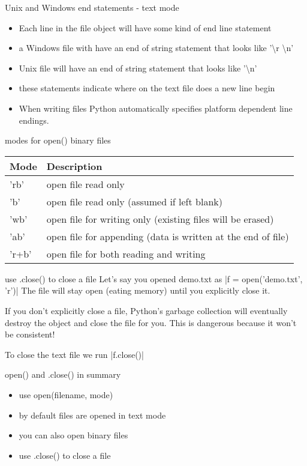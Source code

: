 \documentclass[10pt]{beamer}
\begin{document}
\begin{frame}{Unix and Windows end statements - text mode}
\begin{itemize}
\item Each line in the file object will have some kind of end line statement
\item a Windows file with have an end of string statement that looks like '\textbackslash r \textbackslash n'
\item Unix file will have an end of string statement that looks like '\textbackslash n'
\item these statements indicate where on the text file does a new line begin
\item When writing files Python automatically specifies platform dependent line endings.
\end{itemize}
\end{frame}

\begin{frame}{modes for open() binary files}
\begin{table}
\begin{tabular}{ll}
\textbf{Mode} & \textbf{Description}  \\
\hline
'rb' &	open file read only \\
'b' &	open file read only (assumed if left blank) \\
'wb' & 	open file for writing only (existing files will be erased) \\
'ab' &   open file for appending (data is written at the end of file) \\
'r+b'&   open file for both reading and writing
\end{tabular}
\end{table}
\end{frame}

\begin{frame}[fragile]{use .close() to close a file}
Let's say you opened demo.txt as
|f = open('demo.txt', 'r')|
The file will stay open (eating memory) until you explicitly close it. 

If you don't explicitly close a file, Python's garbage collection will eventually destroy the object and close the file for you. This is dangerous because it won't be consistent!

To close the text file we run
|f.close()|
\end{frame}

\begin{frame}{open() and .close() in summary}
\begin{itemize}
\item use open(filename, mode)
\item by default files are opened in text mode
\item you can also open binary files
\item use .close() to close a file
\end{itemize}
\end{frame}
\end{document}
